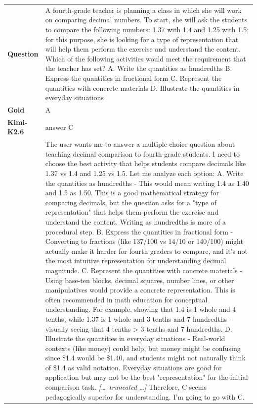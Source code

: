\begin{longtable}{@{}l p{12.5cm}@{}}
  \textbf{Question} & A fourth-grade teacher is planning a class in which she will work on comparing decimal numbers. To start, she will ask the students to compare the following numbers: 1.37 with 1.4 and 1.25 with 1.5; for this purpose, she is looking for a type of representation that will help them perform the exercise and understand the content. Which of the following activities would meet the requirement that the teacher has set? \newline A. Write the quantities as hundredths \newline B. Express the quantities in fractional form \newline C. Represent the quantities with concrete materials \newline D. Illustrate the quantities in everyday situations \\
  \textbf{Gold} & A \\
  \midrule
  \textbf{Kimi-K2.6} & answer C \\
  & The user wants me to answer a multiple-choice question about teaching decimal comparison to fourth-grade students. I need to choose the best activity that helps students compare decimals like 1.37 vs 1.4 and 1.25 vs 1.5. \newline Let me analyze each option: \newline A. Write the quantities as hundredths - This would mean writing 1.4 as 1.40 and 1.5 as 1.50. This is a good mathematical strategy for comparing decimals, but the question asks for a "type of representation" that helps them perform the exercise and understand the content. Writing as hundredths is more of a procedural step. \newline B. Express the quantities in fractional form - Converting to fractions (like 137/100 vs 14/10 or 140/100) might actually make it harder for fourth graders to compare, and it's not the most intuitive representation for understanding decimal magnitude. \newline C. Represent the quantities with concrete materials - Using base-ten blocks, decimal squares, number lines, or other manipulatives would provide a concrete representation. This is often recommended in math education for conceptual understanding. For example, showing that 1.4 is 1 whole and 4 tenths, while 1.37 is 1 whole and 3 tenths and 7 hundredths - visually seeing that 4 tenths \textgreater{} 3 tenths and 7 hundredths. \newline D. Illustrate the quantities in everyday situations - Real-world contexts (like money) could help, but money might be confusing since \$1.4 would be \$1.40, and students might not naturally think of \$1.4 as valid notation. Everyday situations are good for application but may not be the best "representation" for the initial comparison task. \newline \textit{[\ldots\ truncated \ldots]} \newline Therefore, C seems pedagogically superior for understanding. \newline I'm going to go with C. \\

\end{longtable}
